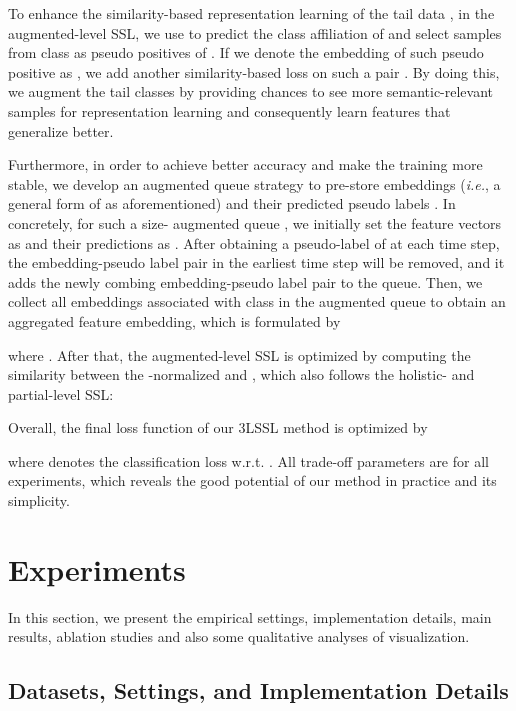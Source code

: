 \documentclass[10pt,journal,compsoc]{IEEEtran}
\newcommand{\ie}{\emph{i.e.}}
\begin{document}
To enhance the similarity-based representation learning of the tail data , in the augmented-level SSL, we use  to predict the class affiliation  of  and select samples from class  as pseudo positives of . If we denote the embedding of such pseudo positive as , we add another similarity-based loss on such a pair . By doing this, we augment the tail classes by providing chances to see more semantic-relevant samples for representation learning and consequently learn features that generalize better. 

Furthermore, in order to achieve better accuracy and make the training more stable, we develop an augmented queue strategy to pre-store embeddings  (\ie, a general form of  as aforementioned) and their predicted pseudo labels . In concretely, for such a size- augmented queue , we initially set the feature vectors as  and their predictions as . After obtaining a pseudo-label  of  at each time step, the embedding-pseudo label pair in the earliest time step will be removed, and it adds the newly combing embedding-pseudo label pair to the queue. Then, we collect all embeddings associated with class  in the augmented queue to obtain an aggregated feature embedding, which is formulated by

where . After that, the augmented-level SSL is optimized by computing the similarity between the -normalized  and , which also follows the holistic- and partial-level SSL:


Overall, the final loss function of our 3LSSL method is optimized by

where  denotes the classification loss w.r.t. . All trade-off parameters are  for all experiments, which reveals the good potential of our method in practice and its simplicity.

\section{Experiments}\label{sec:experiments}

In this section, we present the empirical settings, implementation details, main results, ablation studies and also some qualitative analyses of visualization.

\subsection{Datasets, Settings, and Implementation Details}
\end{document}
